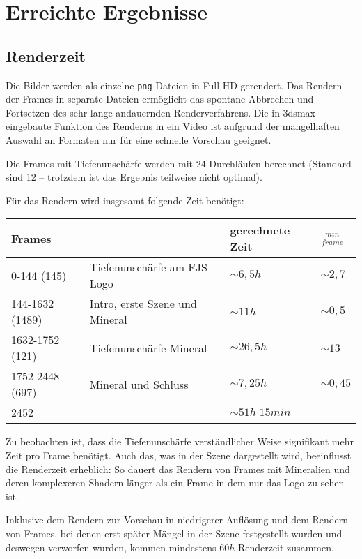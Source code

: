 \documentclass{scrreprt}
\begin{document}
\section{Erreichte Ergebnisse}

\subsection{Renderzeit}
Die Bilder werden als einzelne \texttt{png}-Dateien in Full-HD gerendert. Das Rendern der Frames in separate Dateien ermöglicht das spontane Abbrechen und Fortsetzen des sehr lange andauernden Renderverfahrens. Die in 3dsmax eingebaute Funktion des Renderns in ein Video ist aufgrund der mangelhaften Auswahl an Formaten nur für eine schnelle Vorschau geeignet.

Die Frames mit Tiefenunschärfe werden mit 24 Durchläufen berechnet (Standard sind 12 -- trotzdem ist das Ergebnis teilweise nicht optimal).

Für das Rendern wird insgesamt folgende Zeit benötigt:
\begin{center}{
\def\arraystretch{2}
\begin{tabular}{l l l l}
Frames & & gerechnete Zeit & $\unit{\frac{min}{frame}}$\\\hline
0-144 (145)& Tiefenunschärfe am FJS-Logo & $\sim 6,5\unit{h}$ & $\sim 2,7$\\
144-1632 (1489)& Intro, erste Szene und Mineral & $\sim 11 \unit{h}$ & $ \sim 0,5$\\
1632-1752 (121)& Tiefenunschärfe Mineral & $\sim 26,5 \unit{h}$ & $\sim 13$ \\
1752-2448 (697)& Mineral und Schluss & $\sim 7,25\unit{h}$ & $\sim 0,45$\\\hline
2452 & & $\sim 51 \unit{h}\;15\unit{min}$ &
\end{tabular}
}\end{center}

Zu beobachten ist, dass die Tiefenunschärfe verständlicher Weise signifikant mehr Zeit pro Frame benötigt. Auch das, was in der Szene dargestellt wird, beeinflusst die Renderzeit erheblich: So dauert das Rendern von Frames mit Mineralien und deren komplexeren Shadern länger als ein Frame in dem nur das Logo zu sehen ist.

Inklusive dem Rendern zur Vorschau in niedrigerer Auflösung und dem Rendern von Frames, bei denen erst später Mängel in der Szene festgestellt wurden und deswegen verworfen wurden, kommen mindestens $60 \unit{h}$ Renderzeit zusammen.
\end{document}
